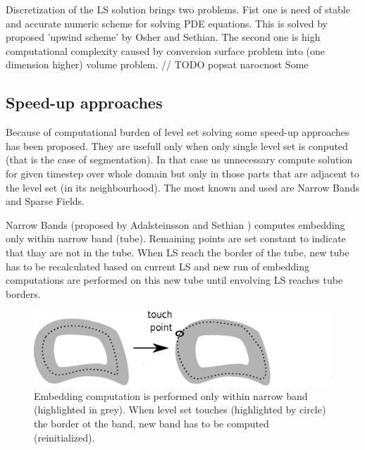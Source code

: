 Discretization of the LS solution brings two problems. Fist one is need of stable and accurate numeric scheme for solving PDE equations. This is solved by proposed 'upwind scheme' by Osher and Sethian\cite{sethianLS}. The second one is high computational complexity caused by conversion surface problem into (one dimension higher) volume problem. 
// TODO popsat narocnost
Some 

\subsection{Speed-up approaches}

Because of computational burden of level set solving some speed-up approaches has been proposed. They are usefull only when only single level set is conputed (that is the case of segmentation). In that case us unnecessary compute solution for given timestep over whole domain but only in those parts that are adjacent to the level set (in its neighbourhood). The most known and used are Narrow Bands and Sparse Fields. 

Narrow Bands (proposed by Adalsteinsson and Sethian \cite{sethianFastLS}) computes embedding only within narrow band (tube). Remaining points are set constant to indicate that thay are not in the tube. When LS reach the border of the tube, new tube has to be recalculated based on current LS and new run of embedding computations are performed on this new tube until envolving LS reaches tube borders.

\begin{figure}
    \centering
    \includegraphics[width=\textwidth]{data/narrowBands}
    \caption[Narrow bands computation illustration]{Embedding computation is performed only within narrow band (highlighted in grey). When level set touches (highlighted by circle) the border ot the band, new band has to be computed (reinitialized).}
    \label{fg:narrowBands}
\end{figure}

